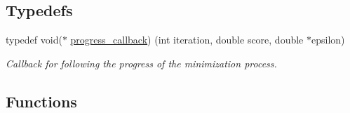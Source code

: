 \subsection*{Typedefs}
\begin{DoxyCompactItemize}
\item 
typedef void($\ast$ \hyperlink{group__soft__constraints_gaa715397c7afd2d2955c315512a3d571a}{progress\+\_\+callback}) (int iteration, double score, double $\ast$epsilon)
\begin{DoxyCompactList}\small\item\em Callback for following the progress of the minimization process. \end{DoxyCompactList}\end{DoxyCompactItemize}
\subsection*{Functions}
